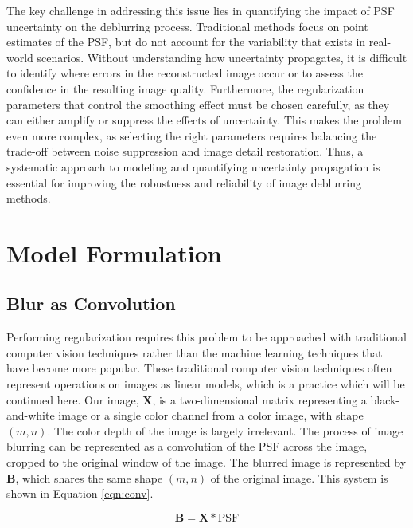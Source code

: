 \documentclass[letterpaper, 10pt, titlepage, twocolumn]{article}
\begin{document}
The key challenge in addressing this issue lies in quantifying the impact of PSF uncertainty on the deblurring process. Traditional methods focus on point estimates of the PSF, but do not account for the variability that exists in real-world scenarios. Without understanding how uncertainty propagates, it is difficult to identify where errors in the reconstructed image occur or to assess the confidence in the resulting image quality. Furthermore, the regularization parameters that control the smoothing effect must be chosen carefully, as they can either amplify or suppress the effects of uncertainty. This makes the problem even more complex, as selecting the right parameters requires balancing the trade-off between noise suppression and image detail restoration. Thus, a systematic approach to modeling and quantifying uncertainty propagation is essential for improving the robustness and reliability of image deblurring methods.


\section*{Model Formulation}

\subsection*{Blur as Convolution}
Performing regularization requires this problem to be approached with traditional computer vision techniques rather than the machine learning techniques that have become more popular. These traditional computer vision techniques often represent operations on images as linear models, which is a practice which will be continued here. Our image, $\mathbf{X}$, is a two-dimensional matrix representing a black-and-white image or a single color channel from a color image, with shape $(m,n)$. The color depth of the image is largely irrelevant. The process of image blurring can be represented as a convolution of the PSF across the image, cropped to the original window of the image. The blurred image is represented by $\mathbf{B}$, which shares the same shape $(m,n)$ of the original image. This system is shown in Equation \eqref{eqn:conv}.

\begin{equation}
    \label{eqn:conv}
    \mathbf{B}=\mathbf{X} \ast \textrm{PSF}
\end{equation}
\end{document}
